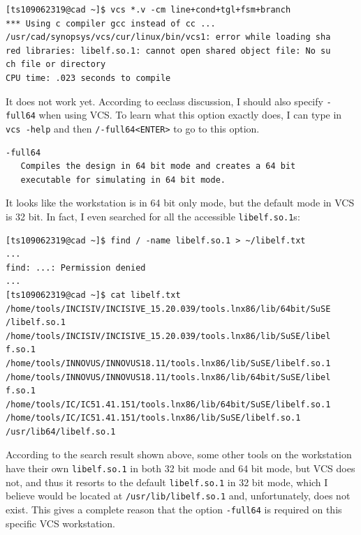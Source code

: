 \documentclass{article}
\begin{document}
\begin{verbatim}
[ts109062319@cad ~]$ vcs *.v -cm line+cond+tgl+fsm+branch
*** Using c compiler gcc instead of cc ...
/usr/cad/synopsys/vcs/cur/linux/bin/vcs1: error while loading sha
red libraries: libelf.so.1: cannot open shared object file: No su
ch file or directory
CPU time: .023 seconds to compile
\end{verbatim}

It does not work yet. According to eeclass discussion, I should also specify \verb|-full64| when using VCS. To learn what this option exactly does, I can type in \verb|vcs -help| and then \verb|/-full64<ENTER>| to go to this option.

\begin{verbatim}
-full64
   Compiles the design in 64 bit mode and creates a 64 bit
   executable for simulating in 64 bit mode.
\end{verbatim}

It looks like the workstation is in 64 bit only mode, but the default mode in VCS is 32 bit. In fact, I even searched for all the accessible \verb|libelf.so.1|s:

\begin{verbatim}
[ts109062319@cad ~]$ find / -name libelf.so.1 > ~/libelf.txt
...
find: ...: Permission denied
...
[ts109062319@cad ~]$ cat libelf.txt
/home/tools/INCISIV/INCISIVE_15.20.039/tools.lnx86/lib/64bit/SuSE
/libelf.so.1
/home/tools/INCISIV/INCISIVE_15.20.039/tools.lnx86/lib/SuSE/libel
f.so.1
/home/tools/INNOVUS/INNOVUS18.11/tools.lnx86/lib/SuSE/libelf.so.1
/home/tools/INNOVUS/INNOVUS18.11/tools.lnx86/lib/64bit/SuSE/libel
f.so.1
/home/tools/IC/IC51.41.151/tools.lnx86/lib/64bit/SuSE/libelf.so.1
/home/tools/IC/IC51.41.151/tools.lnx86/lib/SuSE/libelf.so.1
/usr/lib64/libelf.so.1
\end{verbatim}

According to the search result shown above, some other tools on the workstation have their own \verb|libelf.so.1| in both 32 bit mode and 64 bit mode, but VCS does not, and thus it resorts to the default \verb|libelf.so.1| in 32 bit mode, which I believe would be located at \verb|/usr/lib/libelf.so.1| and, unfortunately, does not exist. This gives a complete reason that the option \verb|-full64| is required on this specific VCS workstation.
\end{document}
